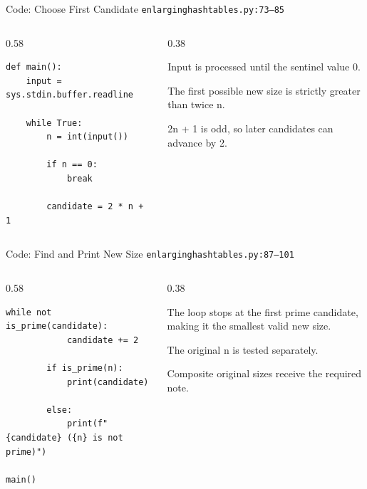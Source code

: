 \documentclass[aspectratio=169,11pt]{beamer}
\begin{document}
\begin{frame}[fragile]{Code: Choose First Candidate}
\scriptsize
{} \texttt{enlarginghashtables.py:73--85}

\vspace{0.08cm}
\begin{columns}[T,totalwidth=\textwidth]
\begin{column}{0.58\textwidth}
\begin{lstlisting}[style=cpcode]
def main():
    input = sys.stdin.buffer.readline

    while True:
        n = int(input())

        if n == 0:
            break

        candidate = 2 * n + 1
\end{lstlisting}
\end{column}
\begin{column}{0.38\textwidth}
\begin{tightitemize}
  \item Input is processed until the sentinel value 0.
  \item The first possible new size is strictly greater than twice n.
  \item 2n + 1 is odd, so later candidates can advance by 2.
\end{tightitemize}
\end{column}
\end{columns}
\end{frame}

\begin{frame}[fragile]{Code: Find and Print New Size}
\scriptsize
{} \texttt{enlarginghashtables.py:87--101}

\vspace{0.08cm}
\begin{columns}[T,totalwidth=\textwidth]
\begin{column}{0.58\textwidth}
\begin{lstlisting}[style=cpcode]
        while not is_prime(candidate):
            candidate += 2

        if is_prime(n):
            print(candidate)

        else:
            print(f"{candidate} ({n} is not prime)")

main()
\end{lstlisting}
\end{column}
\begin{column}{0.38\textwidth}
\begin{tightitemize}
  \item The loop stops at the first prime candidate, making it the smallest valid new size.
  \item The original n is tested separately.
  \item Composite original sizes receive the required note.
\end{tightitemize}
\end{column}
\end{columns}
\end{frame}
\end{document}
